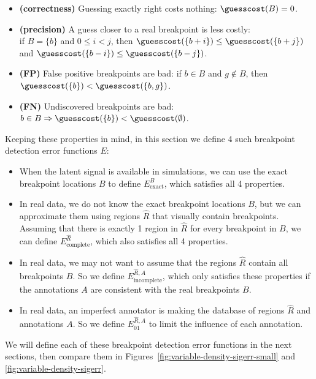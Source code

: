 \documentclass{article}
\begin{document}
\begin{itemize}
\item \textbf{(correctness)} Guessing exactly right costs nothing: ${\guesscost}(B)=0$.
\item \textbf{(precision)} A guess closer to a real breakpoint is less
  costly:\\if $B=\{b\}$ and $0\leq i<j$, then
  ${\guesscost}(\{b+i\})\leq{\guesscost}(\{b+j\})$ and
  ${\guesscost}(\{b-i\})\leq{\guesscost}(\{b-j\})$.
\item \textbf{(FP)} False positive breakpoints are
  bad: if $b\in B$ and $g\not\in B$, then ${\guesscost}(\{b\}) <
  {\guesscost}(\{b,g\})$.
\item \textbf{(FN)} Undiscovered breakpoints are bad:
  $b\in B\Rightarrow{\guesscost}(\{b\}) < {\guesscost}(\emptyset)$.
\end{itemize}

Keeping these properties in mind, in this section we define 4 such
breakpoint detection error functions $E$:
\begin{itemize}
\item When the latent signal is available in simulations, we can use
  the exact breakpoint locations $B$ to define $E^B_{\text{exact}}$,
  which satisfies all 4 properties.
\item In real data, we do not know the exact breakpoint locations $B$,
  but we can approximate them using regions $\hat R$ that visually
  contain breakpoints. Assuming that there is exactly 1 region in
  $\hat R$ for every breakpoint in $B$, we can define
  $E^{\hat R}_{\text{complete}}$, which also satisfies all 4 properties.
\item In real data, we may not want to assume that the regions $\hat
  R$ contain all breakpoints $B$. So we define $E^{\hat
    R,A}_{\text{incomplete}}$, which only satisfies these properties
  if the annotations $A$ are consistent with the real breakpoints $B$.
\item In real data, an imperfect annotator is making the database of
  regions $\hat R$ and annotations $A$. So we define $E_{01}^{\hat
    R,A}$ to limit the influence of each annotation.
\end{itemize}

We will define each of these breakpoint detection error functions in
the next sections, then compare them in
Figures~\ref{fig:variable-density-sigerr-small} and
\ref{fig:variable-density-sigerr}.
\end{document}
